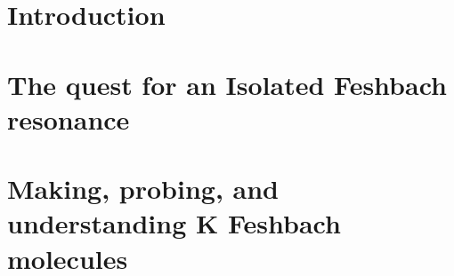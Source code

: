 \documentclass[ twoside,openright,titlepage, numbers=noenddot,%
                headinclude,footinclude,cleardoublepage=empty,abstract=on,
                BCOR=5mm,paper=a4,fontsize=11pt
                ]{scrreprt}
\begin{document}
\frenchspacing
\raggedbottom
{} %
\pagestyle{plain}



\cleardoublepage
\cleardoublepage
\cleardoublepage

\cleardoublepage
\cleardoublepage
\pagestyle{scrheadings}
\cleardoublepage
\part{Introduction}\label{pt:intro}
\cleardoublepage




\part{The quest for an Isolated Feshbach resonance}
\label{pt:questDyKFR}






\part{Making, probing, and understanding \Dy{}K	 Feshbach molecules}\label{pt:MakingProbing}



\end{document}
